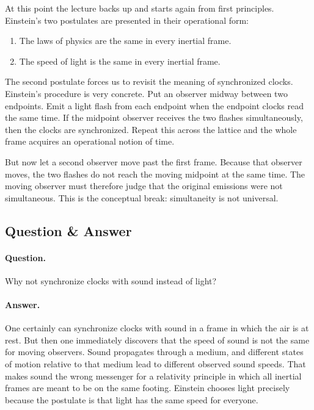 At this point the lecture backs up and starts again from first principles. Einstein's two postulates are presented in their operational form:
\begin{enumerate}
\item The laws of physics are the same in every inertial frame.
\item The speed of light is the same in every inertial frame.
\end{enumerate}

The second postulate forces us to revisit the meaning of synchronized clocks. Einstein's procedure is very concrete. Put an observer midway between two endpoints. Emit a light flash from each endpoint when the endpoint clocks read the same time. If the midpoint observer receives the two flashes simultaneously, then the clocks are synchronized. Repeat this across the lattice and the whole frame acquires an operational notion of time.

But now let a second observer move past the first frame. Because that observer moves, the two flashes do not reach the moving midpoint at the same time. The moving observer must therefore judge that the original emissions were not simultaneous. This is the conceptual break: simultaneity is not universal.

\subsection{Question \& Answer}

\paragraph{Question.} Why not synchronize clocks with sound instead of light?

\paragraph{Answer.} One certainly can synchronize clocks with sound in a frame in which the air is at rest. But then one immediately discovers that the speed of sound is not the same for moving observers. Sound propagates through a medium, and different states of motion relative to that medium lead to different observed sound speeds. That makes sound the wrong messenger for a relativity principle in which all inertial frames are meant to be on the same footing. Einstein chooses light precisely because the postulate is that light has the same speed for everyone.

